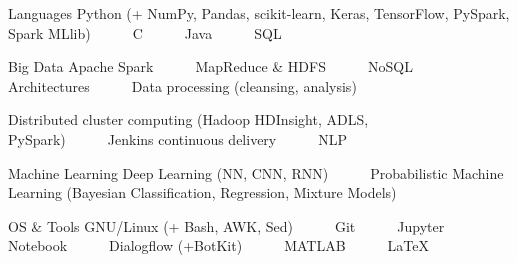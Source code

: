 

\begin{cvskills}

  \cvskill
    {Languages} %
    {Python (+ NumPy, Pandas, scikit-learn, Keras, TensorFlow, PySpark, Spark MLlib)~~~\textbullet~~~C~~~\textbullet~~~Java~~~\textbullet~~~SQL} %

  \cvskill
    {Big Data} %
    {Apache Spark~~~\textbullet~~~MapReduce \& HDFS~~~\textbullet~~~NoSQL Architectures~~~\textbullet~~~Data processing (cleansing, analysis)} %
    
\cvskill
    {} %
    {Distributed cluster computing (Hadoop HDInsight, ADLS, PySpark)~~~\textbullet~~~Jenkins continuous delivery~~~\textbullet~~~NLP} %

  \cvskill
    {Machine Learning} %
    {Deep Learning (NN, CNN, RNN)~~~\textbullet~~~Probabilistic Machine Learning (Bayesian Classification, Regression, Mixture Models)} %

  \cvskill
    {OS \& Tools} %
    {GNU/Linux (+ Bash, AWK, Sed)~~~\textbullet~~~Git~~~\textbullet~~~Jupyter Notebook~~~\textbullet~~~Dialogflow (+BotKit)~~~\textbullet~~~MATLAB~~~\textbullet~~~LaTeX} %

\end{cvskills}
